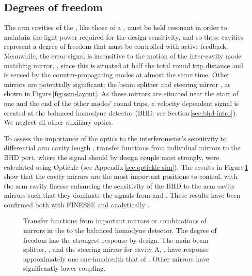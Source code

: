 \subsection{\label{sec:ssm-dofs}Degrees of freedom}
The arm cavities of the \SSM{}, like those of a \FPMI{}, must be held resonant in order to maintain the light power required for the design sensitivity, and so these cavities represent a degree of freedom that must be controlled with active feedback. Meanwhile, the error signal is insensitive to the motion of the inter-cavity mode matching mirror, \MNINE{}, since this is situated at half the total round trip distance and is sensed by the counter-propagating modes at almost the same time. Other mirrors are potentially significant: the beam splitter \MSIX{} and steering mirror \MSEVEN{}, as shown in Figure\,\ref{fig:ssm-layout}. As these mirrors are situated near the start of one and the end of the other modes' round trips, a velocity dependent signal is created at the balanced homodyne detector (\gls{BHD}, see Section\,\ref{sec:bhd-intro}). We neglect all other auxiliary optics.

To assess the importance of the optics to the interferometer's sensitivity to differential arm cavity length \LMINUS{}, transfer functions from individual mirrors to the \gls{BHD} port, where the \LMINUS{} signal should by design couple most strongly, were calculated using Optickle (see Appendix\,\ref{sec:optickle-sim}). The results in Figure\,\ref{fig:ssm-mirror-tfs} show that the cavity mirrors are the most important positions to control, with the arm cavity finesse enhancing the sensitivity of the \gls{BHD} to the arm cavity mirrors such that they dominate the signals from \MSIX{} and \MSEVEN{}. These results have been confirmed both with \gls{FINESSE} and analytically \cite{Glaefke2015}.

\begin{figure}
  \centering
  
  \caption[Transfer functions from important mirrors/combinations of mirrors in the \SSMEXPT{} to the balanced homodyne detector]{\label{fig:ssm-mirror-tfs}Transfer functions from important mirrors or combinations of mirrors in the \SSMEXPT{} to the balanced homodyne detector. The \LMINUS{} degree of freedom has the strongest response by design. The main beam splitter, \MSIX{}, and the steering mirror for cavity A, \MSEVEN{}, have response approximately one one-hundredth that of \LMINUS{}. Other mirrors have significantly lower coupling.}
\end{figure}

